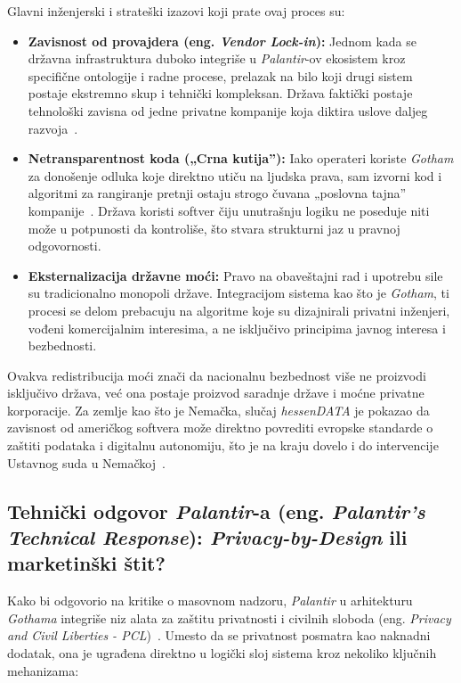 ﻿\documentclass[12pt]{article}
\begin{document}
Glavni inženjerski i strateški izazovi koji prate ovaj proces su:
\begin{itemize}
    \item \textbf{Zavisnost od provajdera (eng. \textit{Vendor Lock-in}):} Jednom kada se državna infrastruktura duboko integriše u \textit{Palantir}-ov ekosistem kroz specifične ontologije i radne procese, prelazak na bilo koji drugi sistem postaje ekstremno skup i tehnički kompleksan.
    Država faktički postaje tehnološki zavisna od jedne privatne kompanije koja diktira uslove daljeg razvoja~\cite{ulbricht2024palantir}.
    \item \textbf{Netransparentnost koda („Crna kutija”):} Iako operateri koriste \textit{Gotham} za donošenje odluka koje direktno utiču na ljudska prava, sam izvorni kod i algoritmi za rangiranje pretnji ostaju strogo čuvana „poslovna tajna” kompanije~\cite{architecture2024}.
    Država koristi softver čiju unutrašnju logiku ne poseduje niti može u potpunosti da kontroliše, što stvara strukturni jaz u pravnoj odgovornosti.
    \item \textbf{Eksternalizacija državne moći:} Pravo na obaveštajni rad i upotrebu sile su tradicionalno monopoli države.
    Integracijom sistema kao što je \textit{Gotham}, ti procesi se delom prebacuju na algoritme koje su dizajnirali privatni inženjeri, vođeni komercijalnim interesima, a ne isključivo principima javnog interesa i bezbednosti.
\end{itemize}

Ovakva redistribucija moći znači da nacionalnu bezbednost više ne proizvodi isključivo država, već ona postaje proizvod saradnje države i moćne privatne korporacije.
Za zemlje kao što je Nemačka, slučaj \textit{hessenDATA} je pokazao da zavisnost od američkog softvera može direktno povrediti evropske standarde o zaštiti podataka i digitalnu autonomiju, što je na kraju dovelo i do intervencije Ustavnog suda u Nemačkoj~\cite{carnegie2024private, ulbricht2024palantir, bverfg2023ruling}.

\subsection{Tehnički odgovor \textit{Palantir}-a (eng. \textit{Palantir's Technical Response}): \textit{Privacy-by-Design} ili marketinški štit?}

Kako bi odgovorio na kritike o masovnom nadzoru, \textit{Palantir} u arhitekturu \textit{Gothama} integriše niz alata za zaštitu privatnosti i civilnih sloboda (eng. \textit{Privacy and Civil Liberties - PCL})~\cite{palantir2024privacy}.
Umesto da se privatnost posmatra kao naknadni dodatak, ona je ugrađena direktno u logički sloj sistema kroz nekoliko ključnih mehanizama:
\end{document}
